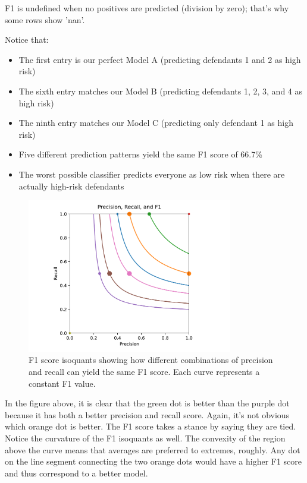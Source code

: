 F1 is undefined when no positives are predicted (division by zero); that's why some rows show 'nan'.

Notice that:
\begin{itemize}
\item The first entry is our perfect Model A (predicting defendants 1 and 2 as high risk)
\item The sixth entry matches our Model B (predicting defendants 1, 2, 3, and 4 as high risk)
\item The ninth entry matches our Model C (predicting only defendant 1 as high risk)
\item Five different prediction patterns yield the same F1 score of 66.7\%
\item The worst possible classifier predicts everyone as low risk when there are actually high-risk defendants
\end{itemize}

\begin{figure}[H]
\centering
\includegraphics[width=0.8\textwidth]{images/scatter_precision_recall_f1.pdf}
\caption{F1 score isoquants showing how different combinations of precision and recall can yield the same F1 score. Each curve represents a constant F1 value.}
\label{fig:f1-isoquants}
\end{figure}

In the figure above, it is clear that the green dot is better than the purple dot because it has both a better precision and recall score. Again, it's not obvious which orange dot is better. The F1 score takes a stance by saying they are tied. Notice the curvature of the F1 isoquants as well. The convexity of the region above the curve means that averages are preferred to extremes, roughly. Any dot on the line segment connecting the two orange dots would have a higher F1 score and thus correspond to a better model.

